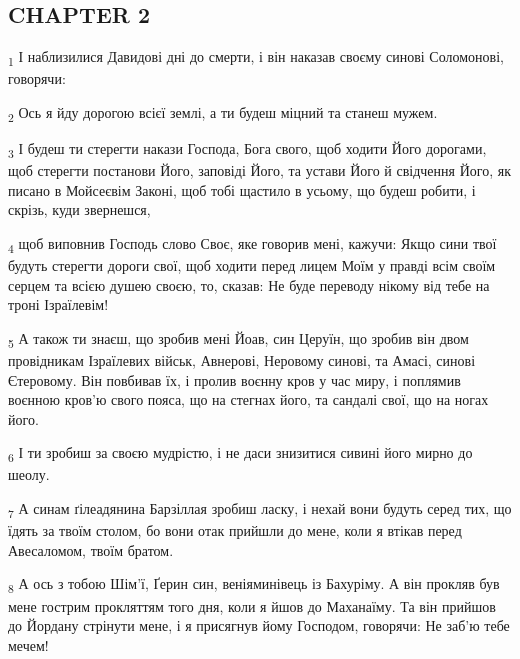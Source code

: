 \subsection{CHAPTER 2}
\begin{tcolorbox}
\textsubscript{1} І наблизилися Давидові дні до смерти, і він наказав своєму синові Соломонові, говорячи:
\end{tcolorbox}
\begin{tcolorbox}
\textsubscript{2} Ось я йду дорогою всієї землі, а ти будеш міцний та станеш мужем.
\end{tcolorbox}
\begin{tcolorbox}
\textsubscript{3} І будеш ти стерегти накази Господа, Бога свого, щоб ходити Його дорогами, щоб стерегти постанови Його, заповіді Його, та устави Його й свідчення Його, як писано в Мойсеєвім Законі, щоб тобі щастило в усьому, що будеш робити, і скрізь, куди звернешся,
\end{tcolorbox}
\begin{tcolorbox}
\textsubscript{4} щоб виповнив Господь слово Своє, яке говорив мені, кажучи: Якщо сини твої будуть стерегти дороги свої, щоб ходити перед лицем Моїм у правді всім своїм серцем та всією душею своєю, то, сказав: Не буде переводу нікому від тебе на троні Ізраїлевім!
\end{tcolorbox}
\begin{tcolorbox}
\textsubscript{5} А також ти знаєш, що зробив мені Йоав, син Церуїн, що зробив він двом провідникам Ізраїлевих військ, Авнерові, Неровому синові, та Амасі, синові Єтеровому. Він повбивав їх, і пролив воєнну кров у час миру, і поплямив воєнною кров'ю свого пояса, що на стегнах його, та сандалі свої, що на ногах його.
\end{tcolorbox}
\begin{tcolorbox}
\textsubscript{6} І ти зробиш за своєю мудрістю, і не даси знизитися сивині його мирно до шеолу.
\end{tcolorbox}
\begin{tcolorbox}
\textsubscript{7} А синам ґілеадянина Барзіллая зробиш ласку, і нехай вони будуть серед тих, що їдять за твоїм столом, бо вони отак прийшли до мене, коли я втікав перед Авесаломом, твоїм братом.
\end{tcolorbox}
\begin{tcolorbox}
\textsubscript{8} А ось з тобою Шім'ї, Ґерин син, веніяминівець із Бахуріму. А він прокляв був мене гострим прокляттям того дня, коли я йшов до Маханаїму. Та він прийшов до Йордану стрінути мене, і я присягнув йому Господом, говорячи: Не заб'ю тебе мечем!
\end{tcolorbox}
